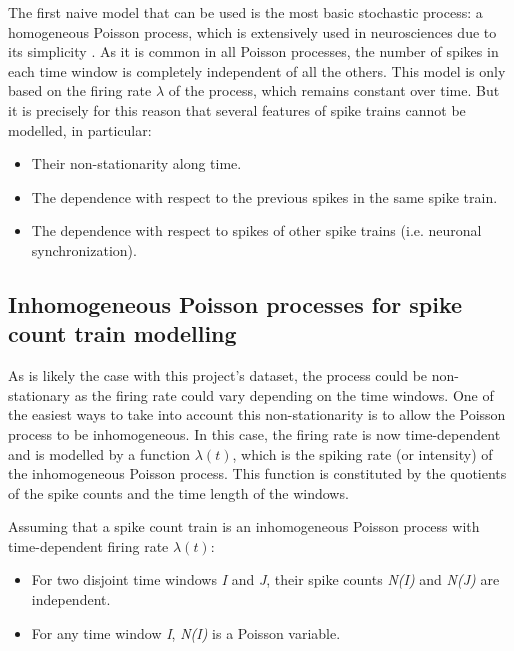 \documentclass{article}
\begin{document}
The first naive model that can be used is the most basic stochastic process: a homogeneous Poisson process, which is extensively used in neurosciences due to its simplicity \citep{Gerstner}. 
As it is common in all Poisson processes, the number of spikes in each time window is completely independent of all the others. 
This model is only based on the firing rate \begin{math}\lambda\end{math} of the process, which remains constant over time. 
But it is precisely for this reason that several features of spike trains cannot be modelled, in particular: 

\begin{itemize}
    \item Their non-stationarity along time.
    \item The dependence with respect to the previous spikes in the same spike train.
    \item The dependence with respect to spikes of other spike trains (i.e. neuronal synchronization).
\end{itemize}

\subsection{Inhomogeneous Poisson processes for spike count train modelling}

As is likely the case with this project's dataset, the process could be non-stationary as the firing rate could vary depending on the time windows. 
One of the easiest ways to take into account this non-stationarity is to allow the Poisson process to be inhomogeneous. 
In this case, the firing rate is now time-dependent and is modelled by a function \begin{math}\lambda(t)\end{math}, which is the spiking rate (or intensity) of the inhomogeneous Poisson process. 
This function is constituted by the quotients of the spike counts and the time length of the windows.

Assuming that a spike count train is an inhomogeneous Poisson process with time-dependent firing rate \begin{math}\lambda(t)\end{math}:

\begin{itemize}
    \item For two disjoint time windows \textit{I} and \textit{J}, their spike counts \textit{N(I)} and \textit{N(J)} are independent.
    \item For any time window \textit{I}, \textit{N(I)} is a Poisson variable.
\end{itemize}
\end{document}
